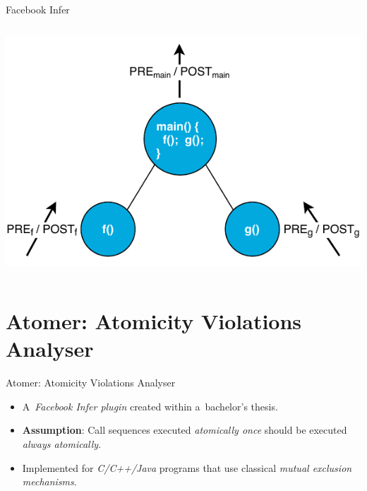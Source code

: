 \documentclass[10pt, hyperref={unicode}, aspectratio=169]{beamer}
\begin{document}
\begin{frame}{Facebook Infer}
\begin{columns}
        \begin{column}{.45 \linewidth}
            \begin{center}
                \includegraphics[width=1 \linewidth]{img/infer.pdf}
            \end{center}
        \end{column}
    \end{columns}
\end{frame}


\section{Atomer: Atomicity Violations Analyser}
\begin{frame}{Atomer: Atomicity Violations Analyser}
    \begin{itemize}\setlength\itemsep{3em}
        \item
            A~\emph{Facebook Infer plugin} created within
            a~bachelor's thesis.
    
        \item
            \textbf{Assumption}: \alert{Call sequences} executed
            \emph{atomically once} should be executed
            \emph{always atomically}.

        \item
            Implemented for \emph{C/C++/Java} programs
            that use classical \emph{mutual exclusion mechanisms}.
    \end{itemize}
\end{frame}
\end{document}
